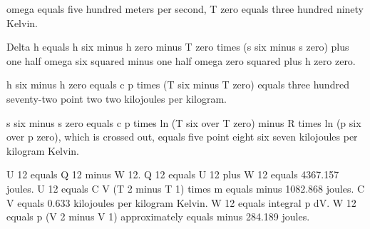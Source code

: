omega equals five hundred meters per second, T zero equals three hundred ninety Kelvin.

Delta h equals h six minus h zero minus T zero times (s six minus s zero) plus one half omega six squared minus one half omega zero squared plus h zero zero.

h six minus h zero equals c p times (T six minus T zero) equals three hundred seventy-two point two two kilojoules per kilogram.

s six minus s zero equals c p times ln (T six over T zero) minus R times ln (p six over p zero), which is crossed out, equals five point eight six seven kilojoules per kilogram Kelvin.

U 12 equals Q 12 minus W 12. Q 12 equals U 12 plus W 12 equals 4367.157 joules. U 12 equals C V (T 2 minus T 1) times m equals minus 1082.868 joules. C V equals 0.633 kilojoules per kilogram Kelvin. W 12 equals integral p dV. W 12 equals p (V 2 minus V 1) approximately equals minus 284.189 joules.